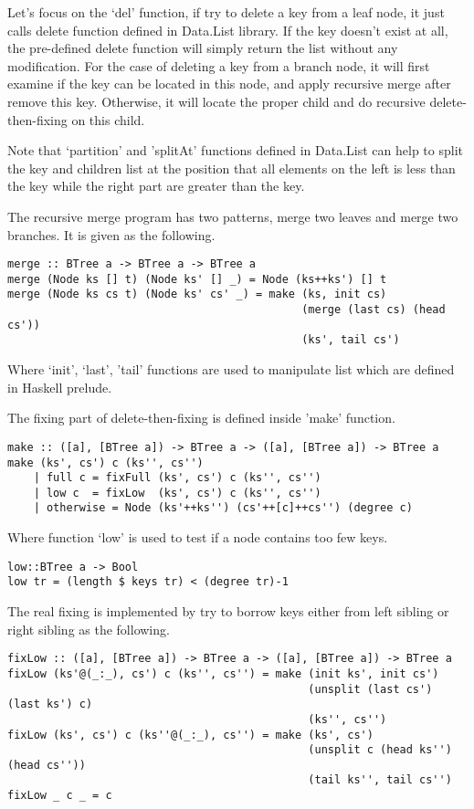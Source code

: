 \documentclass{article}
\begin{document}
Let's focus on the `del' function, if try to delete a key from
a leaf node, it just calls delete function defined in Data.List
library. If the key doesn't exist at all, the pre-defined
delete function will simply return the list without any modification.
For the case of deleting a key from a branch node, it will first examine
if the key can be located in this node, and apply recursive merge
after remove this key. Otherwise, it will locate the proper child
and do recursive delete-then-fixing on this child.

Note that `partition' and 'splitAt' functions defined in Data.List
can help to split the key and children list at the position that
all elements on the left is less than the key while the right part
are greater than the key.

The recursive merge program has two patterns, merge two leaves and
merge two branches. It is given as the following.

\begin{lstlisting}
merge :: BTree a -> BTree a -> BTree a
merge (Node ks [] t) (Node ks' [] _) = Node (ks++ks') [] t
merge (Node ks cs t) (Node ks' cs' _) = make (ks, init cs)
                                             (merge (last cs) (head cs'))
                                             (ks', tail cs')
\end{lstlisting}

Where `init', `last', 'tail' functions are used to manipulate
list which are defined in Haskell prelude.

The fixing part of delete-then-fixing is defined inside 'make'
function.

\begin{lstlisting}
make :: ([a], [BTree a]) -> BTree a -> ([a], [BTree a]) -> BTree a
make (ks', cs') c (ks'', cs'')
    | full c = fixFull (ks', cs') c (ks'', cs'')
    | low c  = fixLow  (ks', cs') c (ks'', cs'')
    | otherwise = Node (ks'++ks'') (cs'++[c]++cs'') (degree c)
\end{lstlisting}

Where function `low' is used to test if a node contains too few keys.

\begin{lstlisting}
low::BTree a -> Bool
low tr = (length $ keys tr) < (degree tr)-1
\end{lstlisting} %

The real fixing is implemented by try to borrow keys either from
left sibling or right sibling as the following.

\begin{lstlisting}
fixLow :: ([a], [BTree a]) -> BTree a -> ([a], [BTree a]) -> BTree a
fixLow (ks'@(_:_), cs') c (ks'', cs'') = make (init ks', init cs')
                                              (unsplit (last cs') (last ks') c)
                                              (ks'', cs'')
fixLow (ks', cs') c (ks''@(_:_), cs'') = make (ks', cs')
                                              (unsplit c (head ks'') (head cs''))
                                              (tail ks'', tail cs'')
fixLow _ c _ = c
\end{lstlisting}
\end{document}
